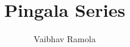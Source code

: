 \documentclass[journal,12pt,twocolumn]{IEEEtran}
\begin{document}
\renewcommand{\thefigure}{\arabic{section}.\arabic{figure}}
\makeatletter
{}
\makeatother


\def\putbox#1#2#3{\makebox[0in][l]{\makebox[#1][l]{}\raisebox{\baselineskip}[0in][0in]{\raisebox{#2}[0in][0in]{#3}}}}
\def\rightbox#1{\makebox[0in][r]{#1}}
\def\centbox#1{\makebox[0in]{#1}}
\def\topbox#1{\raisebox{-\baselineskip}[0in][0in]{#1}}
\def\midbox#1{\raisebox{-0.5\baselineskip}[0in][0in]{#1}}

\vspace{3cm}

\title{ 
	Pingala Series
}


%
%
%

\author{Vaibhav Ramola}
% 
%
\end{document}
